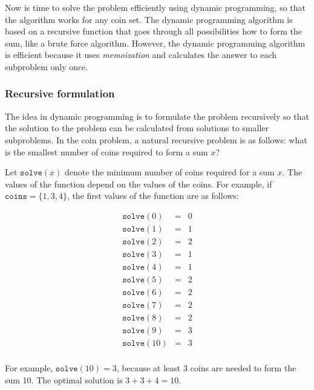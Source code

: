 Now is time to solve the problem efficiently
using dynamic programming, so that the algorithm
works for any coin set.
The dynamic programming
algorithm is based on a recursive function
that goes through all possibilities how to
form the sum, like a brute force algorithm.
However, the dynamic programming
algorithm is efficient because
it uses \emph{memoization} and
calculates the answer to each subproblem only once.

\subsubsection{Recursive formulation}

The idea in dynamic programming is to
formulate the problem recursively so
that the solution to the problem can be
calculated from solutions to smaller
subproblems.
In the coin problem, a natural recursive
problem is as follows:
what is the smallest number of coins
required to form a sum $x$?

Let $\texttt{solve}(x)$
denote the minimum
number of coins required for a sum $x$.
The values of the function depend on the
values of the coins.
For example, if $\texttt{coins} = \{1,3,4\}$,
the first values of the function are as follows:

\[
\begin{array}{lcl}
\texttt{solve}(0) & = & 0 \\
\texttt{solve}(1) & = & 1 \\
\texttt{solve}(2) & = & 2 \\
\texttt{solve}(3) & = & 1 \\
\texttt{solve}(4) & = & 1 \\
\texttt{solve}(5) & = & 2 \\
\texttt{solve}(6) & = & 2 \\
\texttt{solve}(7) & = & 2 \\
\texttt{solve}(8) & = & 2 \\
\texttt{solve}(9) & = & 3 \\
\texttt{solve}(10) & = & 3 \\
\end{array}
\]

For example, $\texttt{solve}(10)=3$,
because at least 3 coins are needed
to form the sum 10.
The optimal solution is $3+3+4=10$.

